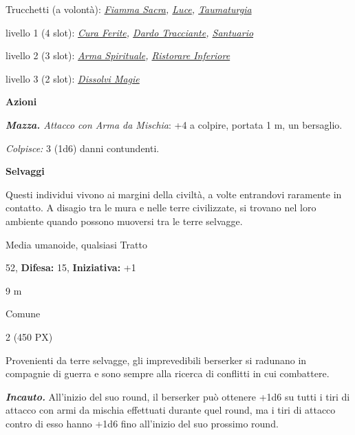 \begin{multicols}{2}
{Trucchetti (a volontà): \emph{\hyperlink{Fiamma Sacra}{Fiamma Sacra}, \hyperlink{Luce}{Luce}, \hyperlink{Taumaturgia}{Taumaturgia}}

livello 1 (4 slot): \emph{\hyperlink{Cura Ferite}{Cura Ferite}, \hyperlink{Dardo Tracciante}{Dardo Tracciante}, \hyperlink{Santuario}{Santuario}}

livello 2 (3 slot): \emph{\hyperlink{Arma Spirituale}{Arma Spirituale}, \hyperlink{Ristorare Inferiore}{Ristorare Inferiore}}

livello 3 (2 slot): \emph{\hyperlink{Dissolvi Magie}{Dissolvi Magie}}

\textbf{Azioni}

\emph{\textbf{Mazza.} Attacco con Arma da Mischia}: +4 a colpire, portata 1 m, un bersaglio.

\emph{Colpisce:} 3 (1d6) danni contundenti.

\medskip\textbf{Selvaggi}

Questi individui vivono ai margini della civiltà, a volte entrandovi raramente in contatto. A disagio tra le mura e nelle terre civilizzate, si trovano nel loro ambiente quando possono muoversi tra le terre selvagge.

\begin{description}[noitemsep, topsep=0pt, parsep=0pt, partopsep=0pt, leftmargin=0cm, labelwidth=2.2cm]
    \item[\textbf{Taglia/Tipo:}] Media umanoide, qualsiasi Tratto
    \item[\textbf{Caratt.:}] 
    \item[\textbf{Punti Ferita:}] 52,  \textbf{Difesa:} 15,  \textbf{Iniziativa:} +1
    \item[\textbf{Tiri Salvez.:}] 
    \item[\textbf{Movimento:}] 9 m
    \item[\textbf{Linguaggi:}] Comune
    \item[\textbf{Sfida:}] 2 (450 PX)\smallskip
\end{description}

Provenienti da terre selvagge, gli imprevedibili berserker si radunano in compagnie di guerra e sono sempre alla ricerca di conflitti in cui combattere.

\emph{\textbf{Incauto.}} All'inizio del suo round, il berserker può ottenere +1d6 su tutti i tiri di attacco con armi da mischia effettuati durante quel round, ma i tiri di attacco contro di esso hanno +1d6 fino all'inizio del suo prossimo round.

}
\end{multicols}
